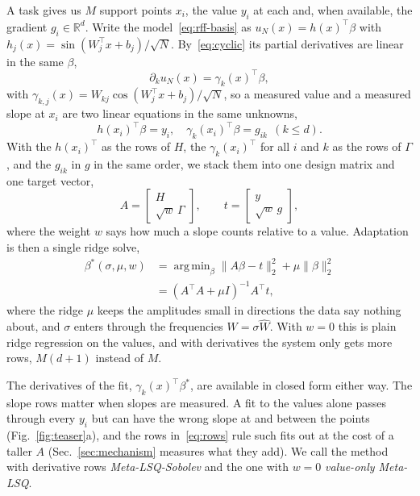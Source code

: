 \documentclass[fullpaper,final]{nldl}
\newcommand{\R}{\mathbb{R}}
\DeclareMathOperator*{\argmin}{arg\,min}
\theoremstyle{plain}
\theoremstyle{definition}
\begin{document}
A task gives us $M$ support points $x_i$, the value $y_i$ at each and, when
available, the gradient $g_i \in \R^d$. Write the model~\eqref{eq:rff-basis} as
$u_N(x) = h(x)^\top\beta$ with $h_j(x) = \sin(W_j^\top x + b_j)/\sqrt{N}$.
By~\eqref{eq:cyclic} its partial derivatives are linear in the same $\beta$,
\begin{equation}
\label{eq:grad-features}
\partial_k u_N(x) = \gamma_k(x)^\top\beta,
\end{equation}
with $\gamma_{k,j}(x) = W_{kj}\cos(W_j^\top x + b_j)/\sqrt{N}$,
so a measured value and a measured slope at $x_i$ are two linear equations in the
same unknowns,
\begin{equation}
\label{eq:rows}
h(x_i)^\top\beta = y_i, \quad \gamma_k(x_i)^\top\beta = g_{ik}\ \ (k \le d).
\end{equation}
With the $h(x_i)^\top$ as the rows of $H$, the $\gamma_k(x_i)^\top$ for all $i$ and
$k$ as the rows of $\Gamma$, and the $g_{ik}$ in $g$ in the same order, we stack
them into one design matrix and one target vector,
\begin{equation}
\label{eq:stack}
A = \begin{bmatrix} H \\ \sqrt{w}\,\Gamma \end{bmatrix},\qquad
t = \begin{bmatrix} y \\ \sqrt{w}\,g \end{bmatrix},
\end{equation}
where the weight $w$ says how much a slope counts relative to a value. Adaptation is
then a single ridge solve,
\begin{align}
\label{eq:beta-star}
\beta^\ast(\sigma,\mu,w)
  &= \argmin_\beta \|A\beta - t\|_2^2 + \mu\|\beta\|_2^2 \nonumber\\
  &= (A^\top\! A + \mu I)^{-1} A^\top t ,
\end{align}
where the ridge $\mu$ keeps the amplitudes small in directions the data say
nothing about, and $\sigma$ enters through the frequencies $W = \sigma\hat W$.
With $w = 0$ this is plain ridge regression on the values, and with derivatives the
system only gets more rows, $M(d{+}1)$ instead of $M$.

The derivatives of the fit, $\gamma_k(x)^\top\beta^\ast$, are available in closed
form either way. The slope rows matter when slopes are measured. A fit to the values
alone passes through every $y_i$ but can have the wrong slope at and between the
points (Fig.~\ref{fig:teaser}a), and the rows in~\eqref{eq:rows} rule such fits out
at the cost of a taller $A$ (Sec.~\ref{sec:mechanism} measures what they add). We call the method with
derivative rows \emph{Meta-LSQ-Sobolev} and the one with $w{=}0$ \emph{value-only
Meta-LSQ}.
\end{document}
